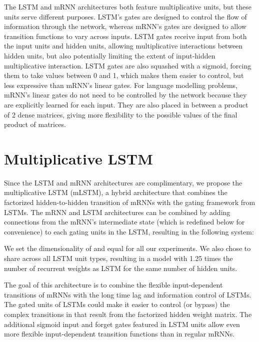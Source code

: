 \documentclass{article}
\begin{document}
The LSTM and mRNN architectures both feature multiplicative units, but these units serve different purposes. LSTM's gates are designed to control the flow of information through the network, whereas mRNN's gates are designed to allow transition functions to vary across inputs. LSTM gates receive input from both the input units and hidden units, allowing multiplicative interactions between hidden units, but also potentially limiting the extent of input-hidden multiplicative interaction. LSTM gates are also squashed with a sigmoid, forcing them to take values between 0 and 1, which makes them easier to control, but less expressive than mRNN's linear gates. For language modelling problems, mRNN's linear gates do not need to be controlled by the network because they are explicitly learned for each input. They are also placed in between a product of 2 dense matrices, giving more flexibility to the possible values of the final product of matrices.




\section{Multiplicative LSTM}
Since the LSTM and mRNN architectures are complimentary, we propose the multiplicative LSTM (mLSTM), a hybrid architecture that combines the factorized hidden-to-hidden transition of mRNNs with the gating framework from LSTMs. The mRNN and LSTM architectures can be combined by adding connections from the mRNN's intermediate state  (which is redefined below for convenience) to each gating units in the LSTM, resulting in the following system:


We set the dimensionality of  and  equal for all our experiments. We also chose to share  across all LSTM unit types, resulting in a model with 1.25 times the number of recurrent weights as LSTM for the same number of hidden units.

The goal of this architecture is to combine the flexible input-dependent transitions of mRNNs with the long time lag and information control of LSTMs. The gated units of LSTMs could make it easier to control (or bypass) the complex transitions in that result from the factorized hidden weight matrix. The additional sigmoid input and forget gates featured in LSTM units allow even more flexible input-dependent transition functions than in regular mRNNs. 
\end{document}
